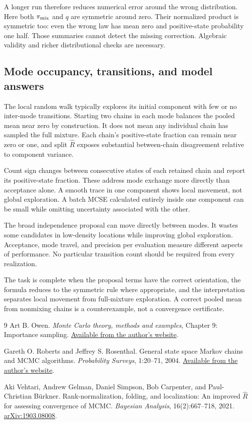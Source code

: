 \documentclass[11pt,a4paper]{article}
\begin{document}
A longer run therefore reduces numerical error around the wrong distribution.
Here both $\pi_{\rm mix}$ and $q$ are symmetric around zero. Their normalized
product is symmetric too: even the wrong law has mean zero and positive-state
probability one half. Those summaries cannot detect the missing correction.
Algebraic validity and richer distributional checks are necessary.

\subsection{Mode occupancy, transitions, and model answers}
The local random walk typically explores its initial component with few or
no inter-mode transitions. Starting two chains in each mode balances the
pooled mean near zero by construction. It does not mean any individual chain
has sampled the full mixture. Each chain's positive-state fraction can remain
near zero or one, and split $\widehat R$ exposes substantial between-chain
disagreement relative to component variance.

Count sign changes between consecutive states of each retained chain and
report its positive-state fraction. These address mode exchange more directly
than acceptance alone. A smooth trace in one component shows local movement,
not global exploration. A batch MCSE calculated entirely inside one component
can be small while omitting uncertainty associated with the other.

The broad independence proposal can move directly between modes. It wastes
some candidates in low-density locations while improving global exploration.
Acceptance, mode travel, and precision per evaluation measure different
aspects of performance. No particular transition count should be required
from every realization.

The task is complete when the proposal terms have the correct orientation,
the formula reduces to the symmetric rule where appropriate, and the
interpretation separates local movement from full-mixture exploration. A
correct pooled mean from nonmixing chains is a counterexample, not a
convergence certificate.

\begin{thebibliography}{9}
Art B. Owen.
\emph{Monte Carlo theory, methods and examples}, Chapter 9: Importance sampling.
\href{https://artowen.su.domains/mc/Ch-var-is.pdf}{Available from the author's website}.

Gareth O. Roberts and Jeffrey S. Rosenthal.
General state space Markov chains and MCMC algorithms.
\emph{Probability Surveys}, 1:20--71, 2004.
\href{https://www.probability.ca/jeff/ftpdir/probsurv.pdf}{Available from the author's website}.

Aki Vehtari, Andrew Gelman, Daniel Simpson, Bob Carpenter, and Paul-Christian
B\"urkner.
Rank-normalization, folding, and localization: An improved $\widehat R$ for
assessing convergence of MCMC.
\emph{Bayesian Analysis}, 16(2):667--718, 2021.
\href{https://arxiv.org/abs/1903.08008}{arXiv:1903.08008}.
\end{thebibliography}
\end{document}
